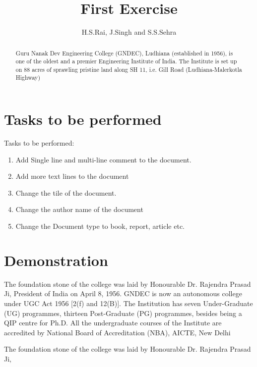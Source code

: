 \documentclass[12pt, letterpaper, twoside]{article}
\title{First Exercise}
\author{H.S.Rai, J.Singh and S.S.Sehra}
\begin{document}
\maketitle
\section*{Tasks to be performed}
Tasks to be performed:
\begin{enumerate}
	\item Add Single line and multi-line comment to the document.
    \item Add more text lines to the document
    \item Change the tile of the document.
   \item Change the author name of the document
   \item Change the Document type to book, report, article etc.
\end{enumerate}
\section*{Demonstration}


\begin{abstract}
Guru Nanak Dev Engineering College (GNDEC), Ludhiana (established in
1956), is one of the oldest and a premier Engineering Institute of India. The Institute is set up on 88 acres of sprawling pristine land along SH 11, i.e. Gill Road (Ludhiana-Malerkotla Highway)
\end{abstract}

The foundation stone of the college was laid by Honourable Dr. Rajendra Prasad Ji, President of India on April 8, 1956. GNDEC is now an autonomous college under UGC Act 1956 [2(f) and 12(B)]. The Institution has seven Under-Graduate (UG) programmes, thirteen Post-Graduate (PG) programmes, besides being a QIP centre for Ph.D. All the undergraduate courses of the Institute are accredited by  National Board of Accreditation (NBA), AICTE, New Delhi

The foundation stone of the college was laid by Honourable Dr. Rajendra Prasad Ji,
\end{document}
